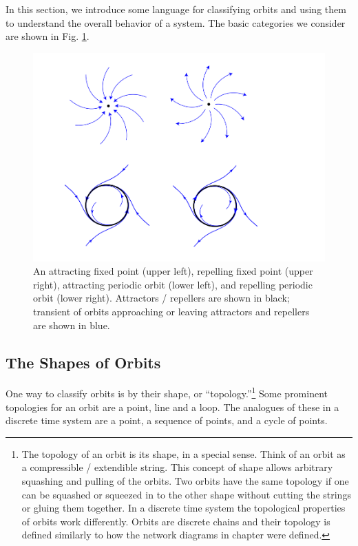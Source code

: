 In this section, we  introduce some language for classifying orbits and using them to understand the overall behavior of a system. The basic categories we consider are shown in Fig. \ref{F:attractorsRepellers}.

\begin{figure}[h]
\centering
\includegraphics[scale=.5]{./images/AttractorsRepellers.png}
\caption[Pamela Payne.]{An attracting fixed point (upper left), repelling fixed point (upper right), attracting periodic orbit (lower left), and repelling periodic orbit (lower right). Attractors / repellers are shown in black; transient of orbits approaching or leaving attractors and repellers are shown in blue.}
\label{F:attractorsRepellers}
\end{figure}

\subsection{The Shapes of Orbits}

One way to classify orbits is by their shape, or ``topology.''\footnote{The topology of an orbit is its shape, in a special sense. Think of an orbit as a compressible / extendible string. This concept of shape allows arbitrary squashing and pulling of the orbits. Two orbits have the same topology if one can be squashed or squeezed in to the other shape without cutting the strings or gluing them together. In a discrete time system the topological properties of orbits work differently. Orbits are discrete chains and their topology is defined similarly to how the network diagrams in chapter  were defined.} Some prominent topologies for an orbit are a point, line and a loop. The analogues of these in a discrete time system are a point, a sequence of points, and a cycle of points. 

